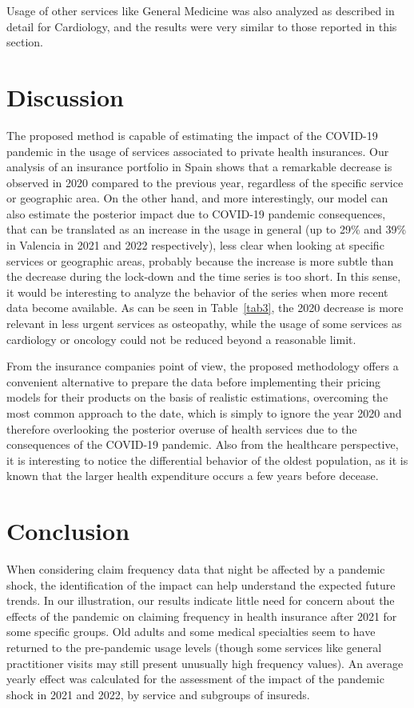 \documentclass[]{risa}
\begin{document}
Usage of other services like General Medicine was also analyzed as described in detail for Cardiology, and the results were very similar to those reported in this section.

\section{Discussion}\label{discussion}
The proposed method is capable of estimating the impact of the COVID-19 pandemic in the usage of services associated to private health insurances. Our analysis of an insurance portfolio in Spain shows that a remarkable decrease is observed in 2020 compared to the previous year, regardless of the specific service or geographic area. On the other hand, and more interestingly, our model can also estimate the posterior impact due to COVID-19 pandemic consequences, that can be translated as an increase in the usage in general (up to 29\% and 39\% in Valencia in 2021 and 2022 respectively), less clear when looking at specific services or geographic areas, probably because the increase is more subtle than the decrease during the lock-down and the time series is too short. In this sense, it would be interesting to analyze the behavior of the series when more recent data become available. As can be seen in Table~\ref{tab3}, the 2020 decrease is more relevant in less urgent services as osteopathy, while the usage of some services as cardiology or oncology could not be reduced beyond a reasonable limit.

From the insurance companies point of view, the proposed methodology offers a convenient alternative to prepare the data before implementing their pricing models for their products on the basis of realistic estimations, overcoming the most common approach to the date, which is simply to ignore the year 2020 and therefore overlooking the posterior overuse of health services due to the consequences of the COVID-19 pandemic. Also from the healthcare perspective, it is interesting to notice the differential behavior of the oldest population, as it is known that the larger health expenditure occurs a few years before decease\cite{lubitz_use_1984, scitovsky_high_2005}. 

\section{Conclusion}
When considering claim frequency data that night be affected by a pandemic shock, the identification of the impact can help understand the expected future trends. In our illustration, our results indicate little need for concern about the effects of the pandemic on claiming frequency in health insurance after 2021 for some specific groups. Old adults and some medical specialties seem to have returned to the pre-pandemic usage levels (though some services like general practitioner visits may still present unusually high frequency values). An average yearly effect was calculated for the assessment of the impact of the pandemic shock in 2021 and 2022, by service and subgroups of insureds. 
\end{document}
